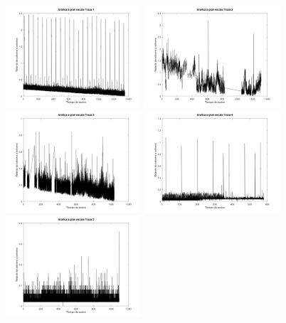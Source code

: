 \begin{enumerate}
  \begin{figure}[h]
      \includegraphics[width=0.45\textwidth]{img/traza1_GE.png}
      \hfill
      \includegraphics[width=0.45\textwidth]{img/traza2_GE.png}
      \vfill
      \includegraphics[width=0.45\textwidth]{img/traza3_GE.png}
      \hfill
      \includegraphics[width=0.45\textwidth]{img/traza4_GE.png}
      \vfill
      \includegraphics[width=0.45\textwidth]{img/traza5_GE.png}

\end{figure}
\end{enumerate}
